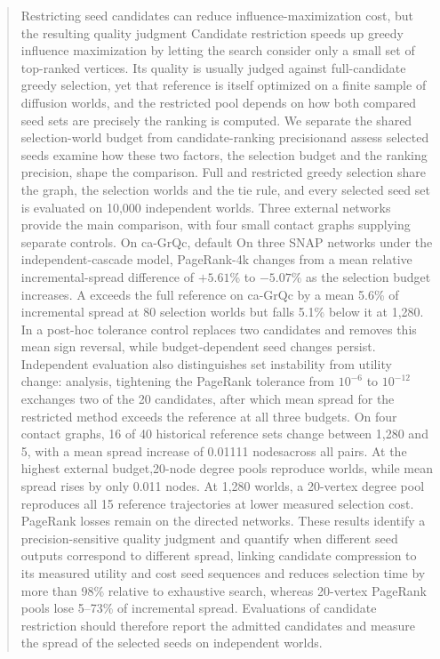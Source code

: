 \documentclass[smallextended]{svjour3}
\providecommand{\DIFaddtex}[1]{{\protect\color{blue} \sf #1}} %
\providecommand{\DIFdeltex}[1]{{\protect\color{red} \scriptsize #1}} %
\providecommand{\DIFaddbegin}{} %
\providecommand{\DIFaddend}{} %
\providecommand{\DIFdelbegin}{} %
\providecommand{\DIFdelend}{} %
\providecommand{\DIFadd}[1]{\texorpdfstring{\DIFaddtex{#1}}{#1}} %
\providecommand{\DIFdel}[1]{\texorpdfstring{\DIFdeltex{#1}}{}} %
\providecommand{\DIFscaledelfig}{0.5}
\newlength{\DIFdelgraphicswidth} %
\newlength{\DIFdelgraphicsheight} %
\providecommand{\DIFaddincludegraphics}[2][]{{\color{blue}\fbox{\DIFOincludegraphics[#1]{#2}}}} %
\providecommand{\DIFdelincludegraphics}[2][]{%
\sbox{\DIFdelgraphicsbox}{\DIFOincludegraphics[#1]{#2}}%
\settoboxwidth{\DIFdelgraphicswidth}{\DIFdelgraphicsbox} %
\settoboxtotalheight{\DIFdelgraphicsheight}{\DIFdelgraphicsbox} %
\scalebox{\DIFscaledelfig}{%
\parbox[b]{\DIFdelgraphicswidth}{\usebox{\DIFdelgraphicsbox}\\[-\baselineskip] \rule{\DIFdelgraphicswidth}{0em}}\llap{\resizebox{\DIFdelgraphicswidth}{\DIFdelgraphicsheight}{%
\setlength{\unitlength}{\DIFdelgraphicswidth}%
\begin{picture}(1,1)%
\thicklines\linethickness{2pt} %
{\color[rgb]{1,0,0}\put(0,0){\framebox(1,1){}}}%
{\color[rgb]{1,0,0}\put(0,0){\line( 1,1){1}}}%
{\color[rgb]{1,0,0}\put(0,1){\line(1,-1){1}}}%
\end{picture}%
}\hspace*{3pt}}} %
} %
\DeclareRobustCommand{\DIFaddbegin}{\DIFOaddbegin \let\includegraphics\DIFaddincludegraphics} %
\DeclareRobustCommand{\DIFaddend}{\DIFOaddend \let\includegraphics\DIFOincludegraphics} %
\DeclareRobustCommand{\DIFdelbegin}{\DIFOdelbegin \let\includegraphics\DIFdelincludegraphics} %
\DeclareRobustCommand{\DIFdelend}{\DIFOaddend \let\includegraphics\DIFOincludegraphics} %
\begin{document}
\begin{abstract}
\DIFdelbegin \DIFdel{Restricting seed candidates can reduce influence-maximization cost, but the resulting quality judgment }\DIFdelend \DIFaddbegin \DIFadd{Candidate restriction speeds up greedy influence maximization by letting the search consider only a small set of top-ranked vertices. Its quality is usually judged against full-candidate greedy selection, yet that reference is itself optimized on a finite sample of diffusion worlds, and the restricted pool }\DIFaddend depends on how \DIFdelbegin \DIFdel{both compared seed sets are }\DIFdelend \DIFaddbegin \DIFadd{precisely the ranking is }\DIFaddend computed. We \DIFdelbegin \DIFdel{separate the shared selection-world budget from candidate-ranking precisionand assess selected seeds }\DIFdelend \DIFaddbegin \DIFadd{examine how these two factors, the selection budget and the ranking precision, shape the comparison. Full and restricted greedy selection share the graph, the selection worlds and the tie rule, and every selected seed set is evaluated }\DIFaddend on 10,000 independent worlds. \DIFdelbegin \DIFdel{Three external networks provide the main comparison, with four small contact graphs supplying separate controls. On ca-GrQc, default }\DIFdelend \DIFaddbegin \DIFadd{On three SNAP networks under the independent-cascade model, }\DIFaddend PageRank-4k \DIFdelbegin \DIFdel{changes from a mean relative incremental-spread difference of $+5.61$\% to $-5.07$\% as the selection budget increases. A }\DIFdelend \DIFaddbegin \DIFadd{exceeds the full reference on ca-GrQc by a mean 5.6\% of incremental spread at 80 selection worlds but falls 5.1\% below it at 1,280. In a }\DIFaddend post-hoc \DIFdelbegin \DIFdel{tolerance control replaces two candidates and removes this mean sign reversal, while budget-dependent seed changes persist. Independent evaluation also distinguishes set instability from utility change: }\DIFdelend \DIFaddbegin \DIFadd{analysis, tightening the PageRank tolerance from $10^{-6}$ to $10^{-12}$ exchanges two of the 20 candidates, after which mean spread for the restricted method exceeds the reference at all three budgets. On four contact graphs, }\DIFaddend 16 of 40 \DIFdelbegin \DIFdel{historical }\DIFdelend reference sets change \DIFaddbegin \DIFadd{between 1,280 and 5}\DIFaddend ,\DIFdelbegin \DIFdel{with a mean spread increase of 0.01111 nodesacross all pairs. At the highest external budget,20-node degree pools reproduce }\DIFdelend \DIFaddbegin \DIFadd{120 worlds, while mean spread rises by only 0.011 nodes. At 1,280 worlds, a 20-vertex degree pool reproduces }\DIFaddend all 15 reference \DIFdelbegin \DIFdel{trajectories at lower measured selection cost. PageRank losses remain on the directed networks. These results identify a precision-sensitive quality judgment and quantify when different seed outputs correspond to different spread, linking candidate compression to its measured utility and cost}\DIFdelend \DIFaddbegin \DIFadd{seed sequences and reduces selection time by more than 98\% relative to exhaustive search, whereas 20-vertex PageRank pools lose 5--73\% of incremental spread. Evaluations of candidate restriction should therefore report the admitted candidates and measure the spread of the selected seeds on independent worlds}\DIFaddend .

\end{abstract}
\end{document}
